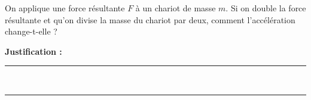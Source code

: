On applique une force résultante $F$ à un chariot de masse $m$. Si on double la force résultante et qu'on divise la masse du chariot par deux, comment l'accélération change-t-elle ?

\choices

\noindent\textbf{Justification :} \hrulefill \\[2.5ex]
\rule{\linewidth}{0.4pt} \\[2.5ex]
\rule{\linewidth}{0.4pt}
\vfill
